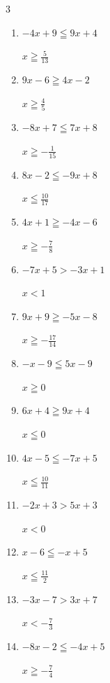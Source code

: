 \begin{multicols}{3}
\begin{enumerate}
  \item $-4x+9\leqq 9x+4$

        $\displaystyle x\geqq \frac{5}{13}$

  \item $9x-6\geqq 4x-2$

        $\displaystyle x\geqq \frac{4}{5}$

  \item $-8x+7\leqq 7x+8$

        $\displaystyle x\geqq -\frac{1}{15}$

  \item $8x-2\leqq -9x+8$

        $\displaystyle x\leqq \frac{10}{17}$

  \item $4x+1\geqq -4x-6$

        $\displaystyle x\geqq -\frac{7}{8}$

  \item $-7x+5>-3x+1$

        $\displaystyle x<1$

  \item $9x+9\geqq -5x-8$

        $\displaystyle x\geqq -\frac{17}{14}$

  \item $-x-9\leqq 5x-9$

        $\displaystyle x\geqq 0$

  \item $6x+4\geqq 9x+4$

        $\displaystyle x\leqq 0$

  \item $4x-5\leqq -7x+5$

        $\displaystyle x\leqq \frac{10}{11}$

  \item $-2x+3>5x+3$

        $\displaystyle x<0$

  \item $x-6\leqq -x+5$

        $\displaystyle x\leqq \frac{11}{2}$

  \item $-3x-7>3x+7$

        $\displaystyle x<-\frac{7}{3}$

  \item $-8x-2\leqq -4x+5$

        $\displaystyle x\geqq -\frac{7}{4}$


\end{enumerate}
\end{multicols}
